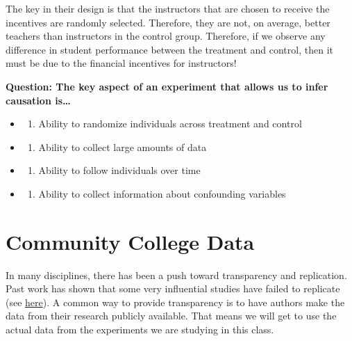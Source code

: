 \documentclass[
]{book}
\providecommand{\tightlist}{%
  \setlength{\itemsep}{0pt}\setlength{\parskip}{0pt}}
\begin{document}
The key in their design is that the instructors that are chosen to receive the incentives are randomly selected. Therefore, they are not, on average, better teachers than instructors in the control group. Therefore, if we observe any difference in student performance between the treatment and control, then it must be due to the financial incentives for instructors!

\textbf{Question: The key aspect of an experiment that allows us to infer causation is\ldots{}}

\begin{itemize}
\tightlist
\item
  \begin{enumerate}
  \def\labelenumi{(\Alph{enumi})}
  \tightlist
  \item
    Ability to randomize individuals across treatment and control\\
  \end{enumerate}
\item
  \begin{enumerate}
  \def\labelenumi{(\Alph{enumi})}
  \setcounter{enumi}{1}
  \tightlist
  \item
    Ability to collect large amounts of data\\
  \end{enumerate}
\item
  \begin{enumerate}
  \def\labelenumi{(\Alph{enumi})}
  \setcounter{enumi}{2}
  \tightlist
  \item
    Ability to follow individuals over time\\
  \end{enumerate}
\item
  \begin{enumerate}
  \def\labelenumi{(\Alph{enumi})}
  \setcounter{enumi}{3}
  \tightlist
  \item
    Ability to collect information about confounding variables
  \end{enumerate}
\end{itemize}

\section{Community College Data}\label{community-college-data}

In many disciplines, there has been a push toward transparency and replication. Past work has shown that some very influential studies have failed to replicate (see \href{https://en.wikipedia.org/wiki/Replication_crisis\#In_economics}{here}). A common way to provide transparency is to have authors make the data from their research publicly available. That means we will get to use the actual data from the experiments we are studying in this class.
\end{document}
